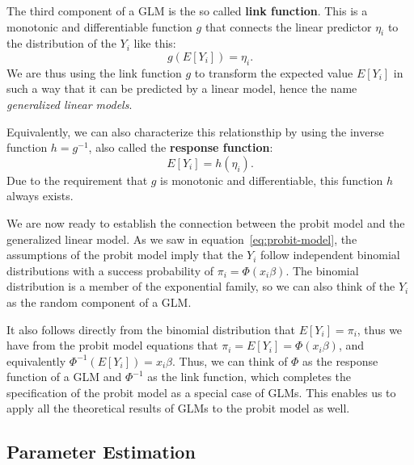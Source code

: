 The third component of a GLM is the so called \textbf{link function}.
This is a monotonic and differentiable function
$g$
that connects the linear predictor $\eta_i$ to the distribution of the
$Y_i$ like this:
\begin{equation*}
    g(E[Y_i]) = \eta_i.
\end{equation*}
We are thus using the link function $g$ to transform the expected value
$E[Y_i]$ in such a way that it can be predicted by a linear model,
hence the name \textit{generalized linear models}.

Equivalently, we can also characterize this relationsthip by using
the inverse function $h = g^{-1}$,
also called the \textbf{response function}:
\begin{equation*}
    E[Y_i] = h(\eta_i).
\end{equation*}
Due to the requirement that $g$ is monotonic and differentiable,
this function $h$ always exists.

We are now ready to establish the connection between the probit model and
the generalized linear model.
As we saw in equation~\ref{eq:probit-model}, the assumptions of the
probit model imply that the $Y_i$ follow independent binomial distributions
with a success probability of $\pi_i = \Phi(x_i \beta)$.
The binomial distribution is a member of the exponential family, so
we can also think of the $Y_i$ as the random component of a GLM.

It also follows directly from the binomial distribution that
$E[Y_i] = \pi_i$, thus we have from the probit model equations that
$\pi_i = E[Y_i] = \Phi(x_i \beta)$, and equivalently
$\Phi^{-1}(E[Y_i]) = x_i \beta$. Thus, we can think of $\Phi$ as the response
function of a GLM and $\Phi^{-1}$ as the link function, which completes
the specification of the probit model as a special case of GLMs.
This enables us to apply all the theoretical results of GLMs to
the probit model as well.

\subsection{Parameter Estimation}

